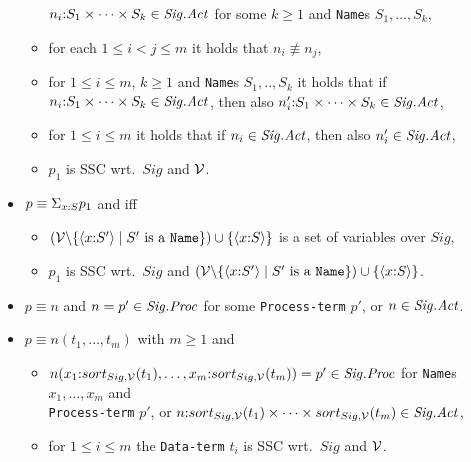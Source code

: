 \documentclass[twoside,fleqn,a4paper,dvips]{article}
\newcommand{\Sig}{\nm{Sig}}
\newcommand{\NV}{{\cal V}}
\begin{document}
\begin{defn}
\begin{itemize}
\begin{itemize}
$n_i\ap S_1\times \cdots\times S_k\in
\Sig.\Act$ for some $k\geq 1$ and {\tt Name}s $S_1,\ldots,S_k$,
\item
for each $1\leq i<j\leq m$ it holds that $n_i\not\equiv n_j$,
\item
for $1\leq i\leq m$, $k\geq 1$ and {\tt Name}s $S_1,..,S_k$ it holds
that if $n_i\ap S_1\times\cdots\times S_k\in \Sig.\Act$, then also
$n_i'\ap S_1\times\cdots\times S_k\in \Sig.\Act$,
\item
for $1\leq i\leq m$ it holds that if $n_i\in \Sig.\Act$, then also
$n_i'\in \Sig.\Act$,
\item
$p_1$ is SSC wrt.\ $Sig$ and $\NV$.
\end{itemize}
\item
$p\equiv \Sigma_{x{:} S}p_1$ and
iff
\begin{itemize}
\item
$(\NV\backslash\{\langle x\ap S'\rangle \mid S'
\mbox{ is a {\tt Name}}\})\cup\{\langle x\ap S\rangle\}$
is a set of variables over $Sig$,
\item
$p_1$ is SSC wrt.\ $Sig$ and
$(\NV\backslash\{\langle x\ap S'\rangle \mid S'\mbox{ is a
{\tt Name}}\})\cup\{\langle x\ap S\rangle\}$.
\end{itemize}
\item
$p\equiv n$ and 
$n=p'\in \Sig.\Proc$ for some {\tt Process-term} $p'$, or $n\in
\Sig.\Act$.
\item
$p\equiv n(t_1,\ldots,t_m)$
with $m\geq 1$ and
\begin{itemize}
\item
$n(x_1\ap sort_{Sig,\NV}(t_1),\ldots,x_m\ap sort_{Sig,\NV}(t_m))=p'\in
\Sig.\Proc$ for {\tt Name}s $x_1,\ldots,x_m$ and\\ {\tt Process-term} $p'$,
or
$n\ap sort_{Sig,\NV}(t_1)\times \cdots\times sort_{Sig,\NV}(t_m)\in
\Sig.\Act$,
\item
for $1\leq i\leq m$ the {\tt Data-term}
$t_i$ is SSC wrt.\ $Sig$ and $\NV$.
\end{itemize}
\end{itemize}
\end{defn}
\end{document}
